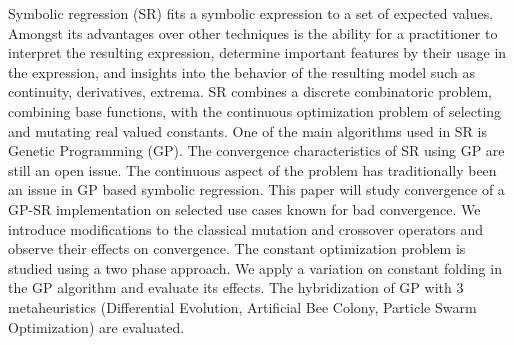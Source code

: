 Symbolic regression (SR) fits a symbolic expression to a set of expected values.
Amongst its advantages over other techniques is the ability for a practitioner to interpret the resulting expression, determine important features by their usage in the expression, and insights into the behavior of the resulting model such as continuity, derivatives, extrema.
SR combines a discrete combinatoric problem, combining base functions, with the continuous optimization problem of selecting and mutating real valued constants.
One of the main algorithms used in SR is Genetic Programming (GP). The convergence characteristics of SR using GP are still an open issue.
The continuous aspect of the problem has traditionally been an issue in GP based symbolic regression. This paper will study convergence of a GP-SR implementation on selected use cases known for bad convergence.
We introduce modifications to the classical mutation and crossover operators and observe their effects on convergence. 
The constant optimization problem is studied using a two phase approach. We apply a variation on constant folding in the GP algorithm and evaluate its effects. The hybridization of GP with 3 metaheuristics (Differential Evolution, Artificial Bee Colony, Particle Swarm Optimization) are evaluated. 
